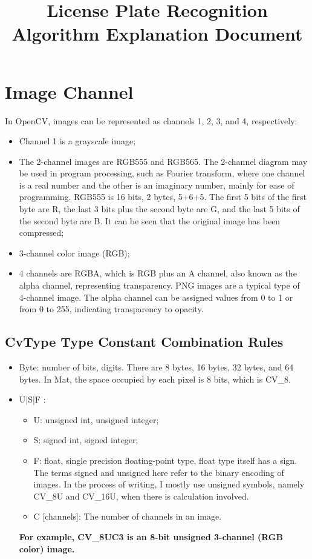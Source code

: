 \documentclass{article}
\title{License Plate Recognition Algorithm Explanation Document}
\author{}
\date{}
\begin{document}
	
	\maketitle
	
	\section{Image Channel}
	In OpenCV, images can be represented as channels 1, 2, 3, and 4, respectively:
	\begin{itemize}
		\item Channel 1 is a grayscale image;
		\item The 2-channel images are RGB555 and RGB565. The 2-channel diagram may be used in program processing, such as Fourier transform, where one channel is a real number and the other is an imaginary number, mainly for ease of programming. RGB555 is 16 bits, 2 bytes, 5+6+5. The first 5 bits of the first byte are R, the last 3 bits plus the second byte are G, and the last 5 bits of the second byte are B. It can be seen that the original image has been compressed;
		\item 3-channel color image (RGB);
		\item 4 channels are RGBA, which is RGB plus an A channel, also known as the alpha channel, representing transparency. PNG images are a typical type of 4-channel image. The alpha channel can be assigned values from 0 to 1 or from 0 to 255, indicating transparency to opacity.
	\end{itemize}
	
	\subsection{CvType Type Constant Combination Rules}
	\begin{itemize}
		\item Byte: number of bits, digits. There are 8 bytes, 16 bytes, 32 bytes, and 64 bytes. In Mat, the space occupied by each pixel is 8 bits, which is CV\_8.
		\item U|S|F :
		\begin{itemize}
			\item U: unsigned int, unsigned integer;
			\item S: signed int, signed integer;
			\item F: float, single precision floating-point type, float type itself has a sign. The terms signed and unsigned here refer to the binary encoding of images. In the process of writing, I mostly use unsigned symbols, namely CV\_8U and CV\_16U, when there is calculation involved.
			\item C [channels]: The number of channels in an image.
		\end{itemize}
		\textbf{For example, CV\_8UC3 is an 8-bit unsigned 3-channel (RGB color) image.}
	\end{itemize}
	
\end{document}

